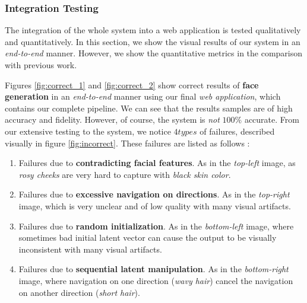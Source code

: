 \begin{itemize}
\end{itemize}

\subsubsection{Integration Testing}
The integration of the whole system into a web application is tested qualitatively and quantitatively. In this section, we show the visual results of our system in an \emph{end-to-end} manner. However, we show the quantitative metrics in the comparison with previous work. 

Figures \ref{fig:correct_1} and \ref{fig:correct_2} show correct results of \textbf{face generation} in an \emph{end-to-end} manner using our final \emph{web application}, which contains our complete pipeline. We can see that the results samples are of high accuracy and fidelity. However, of course, the system is \emph{not} $100\%$ accurate. From our extensive testing to the system, we notice $4 types$ of failures, described visually in figure \ref{fig:incorrect}. These failures are listed as follows :
\begin{enumerate}
    \item Failures due to \textbf{contradicting facial features}. As in the \emph{top-left} image, as \emph{rosy cheeks} are very hard to capture with \emph{black skin color}.
    \item Failures due to \textbf{excessive navigation on directions}. As in the \emph{top-right} image, which is very unclear and of low quality with many visual artifacts.
    \item Failures due to \textbf{random initialization}. As in the \emph{bottom-left} image, where sometimes bad initial latent vector can cause the output to be visually inconsistent with many visual artifacts.
    \item Failures due to \textbf{sequential latent manipulation}. As in the \emph{bottom-right} image, where navigation on one direction (\emph{wavy hair}) cancel the navigation on another direction (\emph{short hair}).
\end{enumerate}

